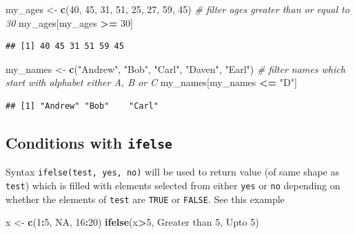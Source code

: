\documentclass[
]{book}
\newenvironment{Shaded}{\begin{snugshade}}{\end{snugshade}}
\newcommand{\CommentTok}[1]{\textcolor[rgb]{0.56,0.35,0.01}{\textit{#1}}}
\newcommand{\ConstantTok}[1]{\textcolor[rgb]{0.56,0.35,0.01}{#1}}
\newcommand{\DecValTok}[1]{\textcolor[rgb]{0.00,0.00,0.81}{#1}}
\newcommand{\FunctionTok}[1]{\textcolor[rgb]{0.13,0.29,0.53}{\textbf{#1}}}
\newcommand{\NormalTok}[1]{#1}
\newcommand{\OtherTok}[1]{\textcolor[rgb]{0.56,0.35,0.01}{#1}}
\newcommand{\SpecialCharTok}[1]{\textcolor[rgb]{0.81,0.36,0.00}{\textbf{#1}}}
\newcommand{\StringTok}[1]{\textcolor[rgb]{0.31,0.60,0.02}{#1}}
\begin{document}
\begin{Shaded}
\begin{Highlighting}[]
\NormalTok{my\_ages }\OtherTok{\textless{}{-}} \FunctionTok{c}\NormalTok{(}\DecValTok{40}\NormalTok{, }\DecValTok{45}\NormalTok{, }\DecValTok{31}\NormalTok{, }\DecValTok{51}\NormalTok{, }\DecValTok{25}\NormalTok{, }\DecValTok{27}\NormalTok{, }\DecValTok{59}\NormalTok{, }\DecValTok{45}\NormalTok{)}
\CommentTok{\# filter ages greater than or equal to 30}
\NormalTok{my\_ages[my\_ages }\SpecialCharTok{\textgreater{}=} \DecValTok{30}\NormalTok{]}
\end{Highlighting}
\end{Shaded}

\begin{verbatim}
## [1] 40 45 31 51 59 45
\end{verbatim}

\begin{Shaded}
\begin{Highlighting}[]
\NormalTok{my\_names }\OtherTok{\textless{}{-}} \FunctionTok{c}\NormalTok{(}\StringTok{"Andrew"}\NormalTok{, }\StringTok{"Bob"}\NormalTok{, }\StringTok{"Carl"}\NormalTok{, }\StringTok{"Daven"}\NormalTok{, }\StringTok{"Earl"}\NormalTok{)}
\CommentTok{\# filter names which start with alphabet either A, B or C}
\NormalTok{my\_names[my\_names }\SpecialCharTok{\textless{}=} \StringTok{"D"}\NormalTok{]}
\end{Highlighting}
\end{Shaded}

\begin{verbatim}
## [1] "Andrew" "Bob"    "Carl"
\end{verbatim}

\hypertarget{conditions-with-ifelse}{%
\subsection*{\texorpdfstring{Conditions with \texttt{ifelse}}{Conditions with ifelse}}\label{conditions-with-ifelse}}

Syntax \texttt{ifelse(test,\ yes,\ no)} will be used to return value (of same shape as \texttt{test}) which is filled with elements selected from either \texttt{yes} or \texttt{no} depending on whether the elements of \texttt{test} are \texttt{TRUE} or \texttt{FALSE}. See this example

\begin{Shaded}
\begin{Highlighting}[]
\NormalTok{x }\OtherTok{\textless{}{-}} \FunctionTok{c}\NormalTok{(}\DecValTok{1}\SpecialCharTok{:}\DecValTok{5}\NormalTok{, }\ConstantTok{NA}\NormalTok{, }\DecValTok{16}\SpecialCharTok{:}\DecValTok{20}\NormalTok{)}
\FunctionTok{ifelse}\NormalTok{(x}\SpecialCharTok{\textgreater{}}\DecValTok{5}\NormalTok{, }\StringTok{\textquotesingle{}Greater than 5\textquotesingle{}}\NormalTok{, }\StringTok{\textquotesingle{}Upto 5\textquotesingle{}}\NormalTok{)}
\end{Highlighting}
\end{Shaded}
\end{document}
